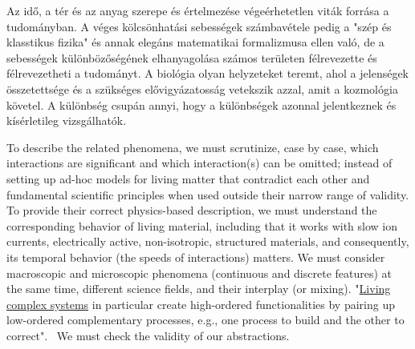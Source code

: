 Az idő, a tér és az anyag szerepe és értelmezése
végeérhetetlen viták forrása a tudományban.
A véges kölcsönhatási sebességek számbavétele pedig
a "szép és klasstikus fizika" és annak elegáns matematikai formalizmusa ellen való, de a sebességek különbözőségének 
elhanyagolása számos területen félrevezette és félrevezetheti 
a tudományt.
A biológia olyan helyzeteket teremt, ahol a jelenségek
összetettsége és a szükséges elővigyázatosság vetekszik
azzal, amit a kozmológia követel.
A különbség csupán annyi, hogy a különbségek azonnal jelentkeznek és kísérletileg vizsgálhatók.
\fi



\ifx\magyar\undefined
To describe the related phenomena, we must scrutinize, case by case, which interactions are significant and
which interaction(s) can be omitted; instead of setting up ad-hoc models for living matter that contradict
each other and fundamental scientific principles when used outside their narrow range of validity. To provide their
correct physics-based description, we must understand the corresponding behavior of living material, including that it works with slow ion currents,
electrically active, non-isotropic, structured materials,
and consequently, its temporal behavior (the speeds of interactions)
matters. We must consider macroscopic and microscopic phenomena (continuous and discrete features) at the same time, different
science fields, and their interplay (or mixing). "\href{https://www.pnas.org/doi/10.1073/pnas.1705704114}{Living complex systems} in
particular create high-ordered functionalities by pairing up low-ordered
complementary processes, e.g., one process to build and the other
to correct".~\cite{BiologicalConservationLaw:2017}
We must check the validity of our abstractions.
\else
\fi


